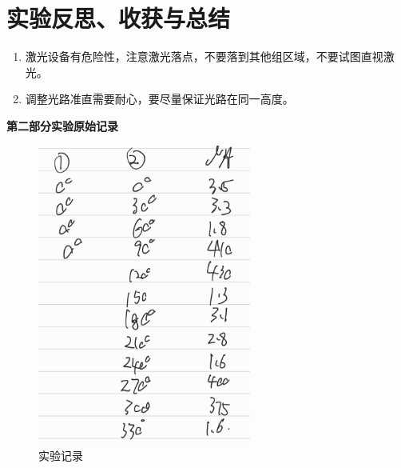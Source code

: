 \documentclass[11pt]{article}
\begin{document}
\section{实验反思、收获与总结}
\begin{enumerate}
    \item 激光设备有危险性，注意激光落点，不要落到其他组区域，不要试图直视激光。
    \item 调整光路准直需要耐心，要尽量保证光路在同一高度。
\end{enumerate}

\begin{center}
    \vspace*{1em}
    \Large \bf 第二部分\qquad 实验原始记录
\end{center}

\begin{figure}[H]
    \centering
    \includegraphics[width=7cm]{Fig/5.jpg}
    \caption{实验记录}
\end{figure}
\end{document}
